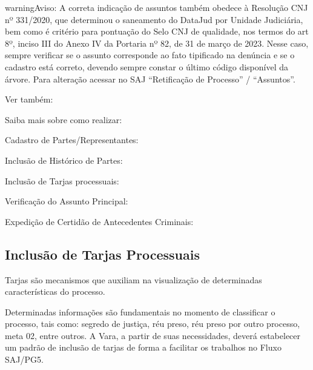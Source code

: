 \documentclass[letterpaper,10pt,brazil]{sphinxmanual}
\begin{document}
\begin{sphinxadmonition}{warning}{Aviso:}
\sphinxAtStartPar
A correta indicação de assuntos também obedece à Resolução CNJ nº 331/2020, que determinou o saneamento do DataJud por Unidade Judiciária, bem como é critério para pontuação do Selo CNJ de qualidade, nos termos do art 8º, inciso III do Anexo IV da Portaria nº 82, de 31 de março de 2023. Nesse caso, sempre verificar se o assunto corresponde ao fato tipificado na denúncia e se o cadastro está correto, devendo sempre constar o último código disponível da árvore. Para alteração acessar no SAJ “Retificação de Processo” / “Assuntos”.
\end{sphinxadmonition}


\begin{sphinxseealso}{Ver também:}

\sphinxAtStartPar
Saiba mais sobre como realizar:

\sphinxAtStartPar
Cadastro de Partes/Representantes: {\hyperref[\detokenize{projud_23_cadastroparte::doc}]{}}

\sphinxAtStartPar
Inclusão de Histórico de Partes: {\hyperref[\detokenize{projud_23_cadastroparte::doc}]{}}

\sphinxAtStartPar
Inclusão de Tarjas processuais: {\hyperref[\detokenize{projud_11_telainicialprocesso::doc}]{}}

\sphinxAtStartPar
Verificação do Assunto Principal: {\hyperref[\detokenize{projud_23_cadastroparte::doc}]{}}

\sphinxAtStartPar
Expedição de Certidão de Antecedentes Criminais: {\hyperref[\detokenize{projud_35_enviarconcluso::doc}]{}}


\end{sphinxseealso}



\subsection{Inclusão de Tarjas Processuais}
\label{\detokenize{01processos_entrados:inclusao-de-tarjas-processuais}}
\sphinxAtStartPar
Tarjas são mecanismos que auxiliam na visualização de determinadas características do processo.

\sphinxAtStartPar
Determinadas informações são fundamentais no momento de classificar o processo, tais como: segredo de justiça, réu preso, réu preso por outro processo, meta 02, entre outros. A Vara, a partir de suas necessidades, deverá estabelecer um padrão de inclusão de tarjas de forma a facilitar os trabalhos no Fluxo SAJ/PG5.
\end{document}
